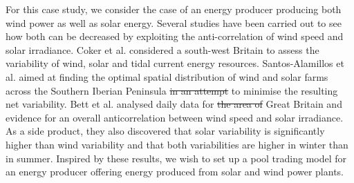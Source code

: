 For this case study, we consider the case of an energy producer producing both wind power as well as solar energy. Several studies have been carried out to see how both   can be decreased by exploiting the anti-correlation of wind speed and solar irradiance. Coker et al. considered a south-west Britain to assess the variability of wind, solar and tidal current energy resources. Santos-Alamillos et al. aimed at finding the optimal spatial distribution of wind and solar farms across the Southern Iberian Peninsula \sout{in an attempt} to minimise the resulting net variability. Bett et al. \cite{BETT16} analysed daily data for \sout{the area of} Great Britain and   evidence for an overall anticorrelation between wind speed and solar irradiance. As a side product, they also discovered that solar variability is significantly higher than wind variability and that both variabilities are higher in winter than in summer. Inspired by these results, we wish to set up a pool trading model for an energy producer offering energy produced from solar and wind power plants.  

